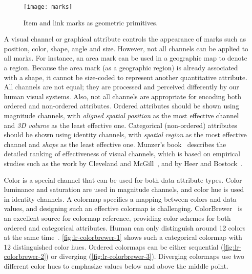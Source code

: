 \begin{figure}[!htb]
	\centering
	\texttt{[image: marks]}
	\caption{Item and link marks as geometric primitives. }
	\label{fig:lr-marks}
\end{figure}

A visual channel or graphical attribute controls the appearance of marks such as position, color, shape, angle and size. However, not all channels can be applied to all marks. For instance, an area mark can be used in a geographic map to denote a region. Because the area mark (as a geographic region) is already associated with a shape, it cannot be size-coded to represent another quantitative attribute. 
All channels are not equal; they are processed and perceived differently by our human visual systems. Also, not all channels are appropriate for encoding both ordered and non-ordered attributes. Ordered attributes should be shown using magnitude channels, with \emph{aligned spatial position} as the most effective channel and \emph{3D volume} as the least effective one. Categorical (non-ordered) attributes should be shown using identity channels, with \emph{spatial region} as the most effective channel and \emph{shape} as the least effective one. Munzer's book~\cite{Munzner2014} describes the detailed ranking of effectiveness of visual channels, which is based on empirical studies such as the work by Cleveland and McGill~\cite{Cleveland1985}, and by Heer and Bostock~\cite{Heer2010a}.

Color is a special channel that can be used for both data attribute types. Color luminance and saturation are used in magnitude channels, and color hue is used in identity channels. A colormap specifies a mapping between colors and data values, and designing such an effective colormap is challenging. ColorBrewer~\cite{Harrower2003} is an excellent source for colormap reference, providing color schemes for both ordered and categorical attributes. Human can only distinguish around 12 colors at the same time~\cite{Munzner2014}. \autoref{fig:lr-colorbrewer-1} shows such a categorical colormap with 12 distinguished color hues. Ordered colormaps can be either sequential (\autoref{fig:lr-colorbrewer-2}) or diverging (\autoref{fig:lr-colorbrewer-3}). Diverging colormaps use two different color hues to emphasize values below and above the middle point.

